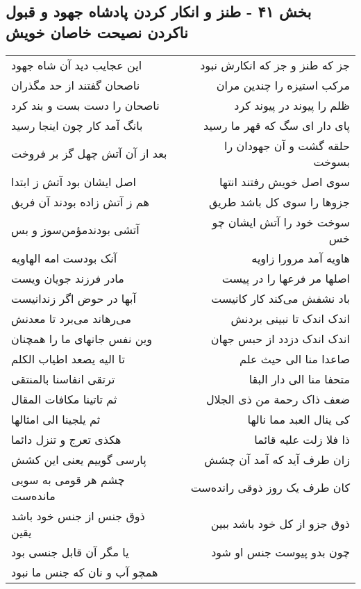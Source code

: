 \begin{center}
\section*{بخش ۴۱ - طنز و انکار کردن پادشاه جهود و قبول ناکردن نصیحت خاصان خویش}
\label{sec:sh041}
\begin{longtable}{l p{0.5cm} r}
این عجایب دید آن شاه جهود
&&
جز که طنز و جز که انکارش نبود
\\
ناصحان گفتند از حد مگذران
&&
مرکب استیزه را چندین مران
\\
ناصحان را دست بست و بند کرد
&&
ظلم را پیوند در پیوند کرد
\\
بانگ آمد کار چون اینجا رسید
&&
پای دار ای سگ که قهر ما رسید
\\
بعد از آن آتش چهل گز بر فروخت
&&
حلقه گشت و آن جهودان را بسوخت
\\
اصل ایشان بود آتش ز ابتدا
&&
سوی اصل خویش رفتند انتها
\\
هم ز آتش زاده بودند آن فریق
&&
جزوها را سوی کل باشد طریق
\\
آتشی بودندمؤمن‌سوز و بس
&&
سوخت خود را آتش ایشان چو خس
\\
آنک بودست امه الهاویه
&&
هاویه آمد مرورا زاویه
\\
مادر فرزند جویان ویست
&&
اصلها مر فرعها را در پیست
\\
آبها در حوض اگر زندانیست
&&
باد نشفش می‌کند کار کانیست
\\
می‌رهاند می‌برد تا معدنش
&&
اندک اندک تا نبینی بردنش
\\
وین نفس جانهای ما را همچنان
&&
اندک اندک دزدد از حبس جهان
\\
تا الیه یصعد اطیاب الکلم
&&
صاعدا منا الی حیث علم
\\
ترتقی انفاسنا بالمنتقی
&&
متحفا منا الی دار البقا
\\
ثم تاتینا مکافات المقال
&&
ضعف ذاک رحمة من ذی الجلال
\\
ثم یلجینا الی امثالها
&&
کی ینال العبد مما نالها
\\
هکذی تعرج و تنزل دائما
&&
ذا فلا زلت علیه قائما
\\
پارسی گوییم یعنی این کشش
&&
زان طرف آید که آمد آن چشش
\\
چشم هر قومی به سویی مانده‌ست
&&
کان طرف یک روز ذوقی رانده‌ست
\\
ذوق جنس از جنس خود باشد یقین
&&
ذوق جزو از کل خود باشد ببین
\\
یا مگر آن قابل جنسی بود
&&
چون بدو پیوست جنس او شود
\\
همچو آب و نان که جنس ما نبود

\end{longtable}
\end{center}
